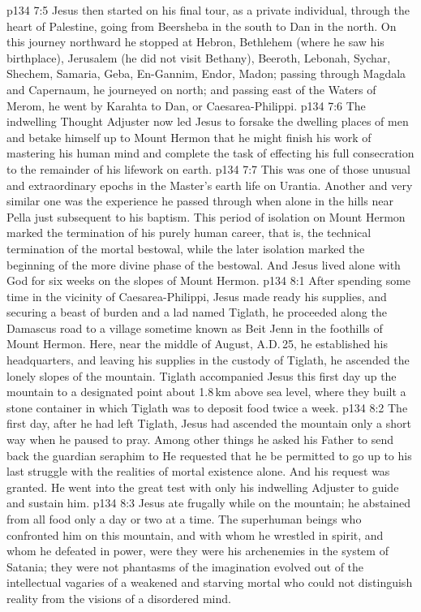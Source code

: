 \vs p134 7:5 Jesus then started on his final tour, as a private individual, through the heart of Palestine, going from Beersheba in the south to Dan in the north. On this journey northward he stopped at Hebron, Bethlehem (where he saw his birthplace), Jerusalem (he did not visit Bethany), Beeroth, Lebonah, Sychar, Shechem, Samaria, Geba, En\hyp{}Gannim, Endor, Madon; passing through Magdala and Capernaum, he journeyed on north; and passing east of the Waters of Merom, he went by Karahta to Dan, or Caesarea\hyp{}Philippi.
\vs p134 7:6 The indwelling Thought Adjuster now led Jesus to forsake the dwelling places of men and betake himself up to Mount Hermon that he might finish his work of mastering his human mind and complete the task of effecting his full consecration to the remainder of his lifework on earth.
\vs p134 7:7 This was one of those unusual and extraordinary epochs in the Master’s earth life on Urantia. Another and very similar one was the experience he passed through when alone in the hills near Pella just subsequent to his baptism. This period of isolation on Mount Hermon marked the termination of his purely human career, that is, the technical termination of the mortal bestowal, while the later isolation marked the beginning of the more divine phase of the bestowal. And Jesus lived alone with God for six weeks on the slopes of Mount Hermon.
\vs p134 8:1 After spending some time in the vicinity of Caesarea\hyp{}Philippi, Jesus made ready his supplies, and securing a beast of burden and a lad named Tiglath, he proceeded along the Damascus road to a village sometime known as Beit Jenn in the foothills of Mount Hermon. Here, near the middle of August, A.D.\,25, he established his headquarters, and leaving his supplies in the custody of Tiglath, he ascended the lonely slopes of the mountain. Tiglath accompanied Jesus this first day up the mountain to a designated point about 1.8\,km above sea level, where they built a stone container in which Tiglath was to deposit food twice a week.
\vs p134 8:2 The first day, after he had left Tiglath, Jesus had ascended the mountain only a short way when he paused to pray. Among other things he asked his Father to send back the guardian seraphim to  He requested that he be permitted to go up to his last struggle with the realities of mortal existence alone. And his request was granted. He went into the great test with only his indwelling Adjuster to guide and sustain him.
\vs p134 8:3 \pc Jesus ate frugally while on the mountain; he abstained from all food only a day or two at a time. The superhuman beings who confronted him on this mountain, and with whom he wrestled in spirit, and whom he defeated in power, were  they were his archenemies in the system of Satania; they were not phantasms of the imagination evolved out of the intellectual vagaries of a weakened and starving mortal who could not distinguish reality from the visions of a disordered mind.
